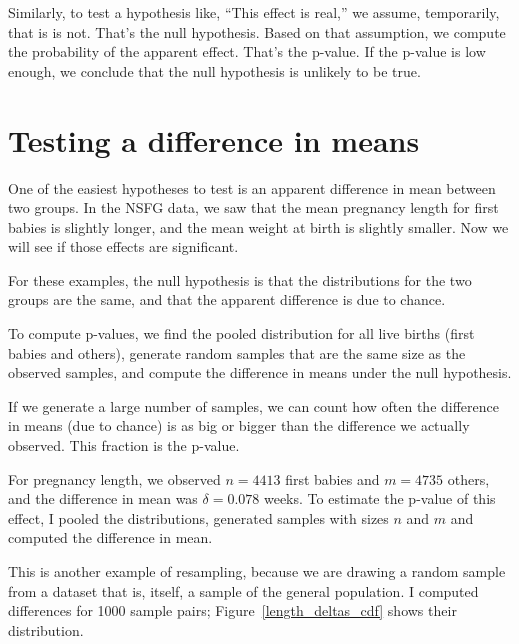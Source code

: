 \documentclass[12pt]{book}
\begin{document}

Similarly, to test a hypothesis like, ``This effect is real,'' we
assume, temporarily, that is is not.  That's the null hypothesis.
Based on that assumption, we compute the probability of the apparent
effect.  That's the p-value.  If the p-value is low enough, we
conclude that the null hypothesis is unlikely to be true.


\section{Testing a difference in means}

One of the easiest hypotheses to test is an apparent difference in mean
between two groups.  In the NSFG data, we saw that the mean pregnancy
length for first babies is slightly longer, and the mean weight at
birth is slightly smaller.  Now we will see if those effects are
significant.


For these examples, the null hypothesis is that the distributions
for the two groups are the same, and that the apparent difference is
due to chance.


To compute p-values, we find the pooled distribution for all live
births (first babies and others), generate random samples that are
the same size as the observed samples, and compute the difference
in means under the null hypothesis.


If we generate a large number of samples, we can count how often the
difference in means (due to chance) is as big or bigger than the
difference we actually observed.  This fraction is the p-value.

For pregnancy length, we observed $n=4413$ first babies and $m=4735$
others, and the difference in mean was $\delta=0.078$ weeks.  To estimate
the p-value of this effect, I pooled the distributions, generated
samples with sizes $n$ and $m$ and computed the difference in mean.


This is another example of resampling, because we are drawing a
random sample from a dataset that is, itself, a sample of the general
population.  I computed differences for 1000 sample pairs;
Figure~\ref{length_deltas_cdf} shows their distribution.
\end{document}
